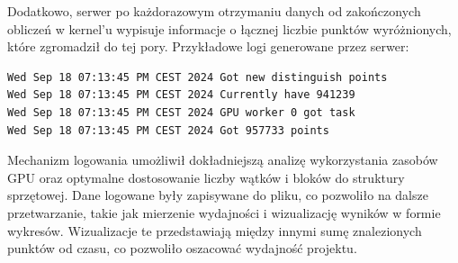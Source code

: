 Dodatkowo, serwer po każdorazowym otrzymaniu danych od zakończonych obliczeń
w kernel'u wypisuje informacje o łącznej liczbie punktów wyróżnionych, które
zgromadził do tej pory. Przykładowe logi generowane przez serwer:
\begin{verbatim}
Wed Sep 18 07:13:45 PM CEST 2024 Got new distinguish points
Wed Sep 18 07:13:45 PM CEST 2024 Currently have 941239
Wed Sep 18 07:13:45 PM CEST 2024 GPU worker 0 got task
Wed Sep 18 07:13:45 PM CEST 2024 Got 957733 points
\end{verbatim}

Mechanizm logowania umożliwił dokładniejszą analizę wykorzystania zasobów GPU oraz
optymalne dostosowanie liczby wątków i bloków do struktury sprzętowej. Dane logowane
były zapisywane do pliku, co pozwoliło na dalsze przetwarzanie, takie jak mierzenie
wydajności i wizualizację wyników w formie wykresów. Wizualizacje te przedstawiają
między innymi sumę znalezionych punktów od czasu,
co pozwoliło oszacować wydajność projektu.
